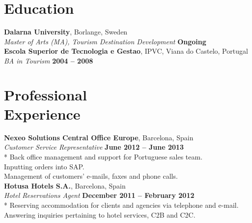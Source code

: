 \documentclass[margin,line]{resume}
\begin{document}
\begin{resume}
    \section{\mysidestyle Education}
    \textbf{Dalarna University}, Borlange, Sweden \vspace{2mm}\\\vspace{1mm}%
    \textsl{Master of Arts (MA), Tourism Destination Development}\hfill \textbf{ Ongoing}\\
    \textbf{Escola Superior de Tecnologia e Gestao}, IPVC, Viana do Castelo, Portugal \vspace{2mm}\\\vspace{1mm}%
    \textsl{BA in Tourism}\hfill \textbf{ 2004 -- 2008}\\


    \section{\mysidestyle Professional\\Experience}
    \textbf{Nexeo Solutions Central Office Europe}, Barcelona, Spain \vspace{2mm}\\\vspace{1mm}%
    \textsl{Customer Service Representative} \hfill \textbf{June 2012 -- June 2013}\\*
    Back office management and support for Portuguese sales team. \vspace{1mm}\\%
    Inputting orders into SAP. \vspace{1mm}\\%
    Management of customers' e-mails, faxes and phone calls. \vspace{1mm}\\%
    
    \textbf{Hotusa Hotels S.A.}, Barcelona, Spain \vspace{2mm}\\\vspace{1mm}%
    \textsl{Hotel Reservations Agent} \hfill \textbf{December 2011 -- February 2012}\\*
    Reserving accommodation for clients and agencies via telephone and e-mail. \vspace{1mm}\\%
    Answering inquiries pertaining to hotel services, C2B and C2C. \vspace{1mm}\\%
    

\end{resume}
\end{document}
